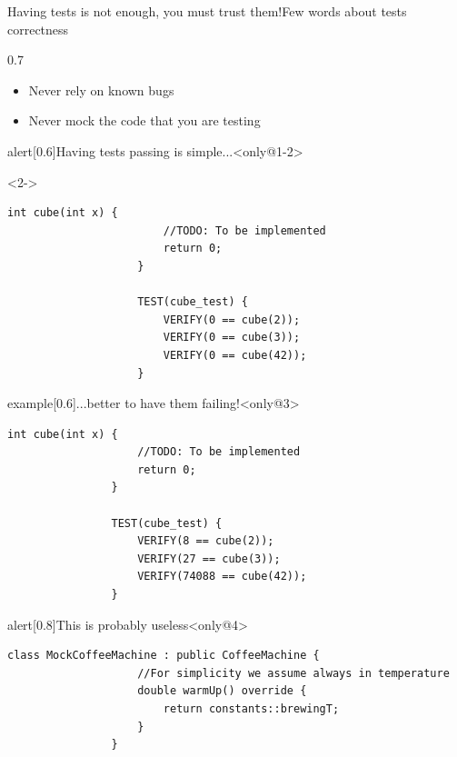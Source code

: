 \begin{frame}[fragile]{Having tests is not enough, you must trust them!}{Few words about tests correctness}
    \begin{overlayarea}{\textwidth}{0.7\textheight}
        \begin{itemize}
            \item Never rely on known bugs
            \item<only@4-> Never mock the code that you are testing
        \end{itemize}
        \begin{varblock}{alert}[0.6\textwidth]{Having tests passing is simple...}<only@1-2>
            \begin{uncoverenv}<2->
                \begin{lstlisting}[style=MyCpp]
                    int cube(int x) {
                        //TODO: To be implemented
                        return 0;
                    }

                    TEST(cube_test) {
                        VERIFY(0 == cube(2));
                        VERIFY(0 == cube(3));
                        VERIFY(0 == cube(42));
                    }
                \end{lstlisting}
            \end{uncoverenv}
        \end{varblock}
        \begin{varblock}{example}[0.6\textwidth]{...better to have them failing!}<only@3>
            \begin{lstlisting}[style=MyCpp]
                int cube(int x) {
                    //TODO: To be implemented
                    return 0;
                }

                TEST(cube_test) {
                    VERIFY(8 == cube(2));
                    VERIFY(27 == cube(3));
                    VERIFY(74088 == cube(42));
                }
            \end{lstlisting}
        \end{varblock}
        \begin{varblock}{alert}[0.8\textwidth]{This is probably useless}<only@4>
            \begin{lstlisting}[style=MyCpp]
                class MockCoffeeMachine : public CoffeeMachine {
                    //For simplicity we assume always in temperature
                    double warmUp() override {
                        return constants::brewingT;
                    }
                }


\end{lstlisting}
\end{varblock}
\end{overlayarea}
\end{frame}
